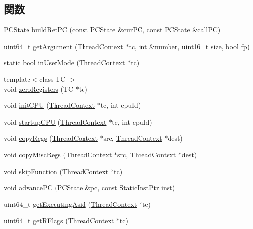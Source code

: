 \subsection*{関数}
\begin{DoxyCompactItemize}
\item 
PCState \hyperlink{namespaceX86ISA_a34db5b34654d49b312f2f744f3453346}{buildRetPC} (const PCState \&curPC, const PCState \&callPC)
\item 
uint64\_\-t \hyperlink{namespaceX86ISA_a3f9560369e934be05b1dd8f23fbd6104}{getArgument} (\hyperlink{classThreadContext}{ThreadContext} $\ast$tc, int \&number, uint16\_\-t size, bool fp)
\item 
static bool \hyperlink{namespaceX86ISA_a59cc15503fa0b85477b179e132bb6a5a}{inUserMode} (\hyperlink{classThreadContext}{ThreadContext} $\ast$tc)
\item 
{\footnotesize template$<$class TC $>$ }\\void \hyperlink{namespaceX86ISA_ac9d201d766da7a0a0f4831a76975c25c}{zeroRegisters} (TC $\ast$tc)
\item 
void \hyperlink{namespaceX86ISA_aded557a1e716c6f849b0e0b05fc77676}{initCPU} (\hyperlink{classThreadContext}{ThreadContext} $\ast$tc, int cpuId)
\item 
void \hyperlink{namespaceX86ISA_a343e9193078845bb700799b0c7f24d2a}{startupCPU} (\hyperlink{classThreadContext}{ThreadContext} $\ast$tc, int cpuId)
\item 
void \hyperlink{namespaceX86ISA_aaeffcccf262b0dbd3cbcc8b4cef41168}{copyRegs} (\hyperlink{classThreadContext}{ThreadContext} $\ast$src, \hyperlink{classThreadContext}{ThreadContext} $\ast$dest)
\item 
void \hyperlink{namespaceX86ISA_a42833096094e5ff0f2de948bf8e5965c}{copyMiscRegs} (\hyperlink{classThreadContext}{ThreadContext} $\ast$src, \hyperlink{classThreadContext}{ThreadContext} $\ast$dest)
\item 
void \hyperlink{namespaceX86ISA_a2624d7d8bac3eb03de2eb6e83903c208}{skipFunction} (\hyperlink{classThreadContext}{ThreadContext} $\ast$tc)
\item 
void \hyperlink{namespaceX86ISA_a9f66bf123d3bde93ad41499d68e98819}{advancePC} (PCState \&pc, const \hyperlink{classRefCountingPtr}{StaticInstPtr} inst)
\item 
uint64\_\-t \hyperlink{namespaceX86ISA_a8515a02a584a55f928e9bd214b441632}{getExecutingAsid} (\hyperlink{classThreadContext}{ThreadContext} $\ast$tc)
\item 
uint64\_\-t \hyperlink{namespaceX86ISA_ab5e0d51a18a3bce3397edd01a4b51492}{getRFlags} (\hyperlink{classThreadContext}{ThreadContext} $\ast$tc)

\end{DoxyCompactItemize}
